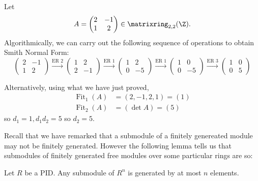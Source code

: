 \documentclass[a4paper]{article}
\theoremstyle{definition}
\DeclareMathOperator{\fit}{Fit}
\begin{document}
\begin{eg}
  Let
  \[
    A =
    \begin{pmatrix}
      2 & -1 \\
      1 & 2
    \end{pmatrix}
    \in \matrixring_{2, 2}(\Z).
  \]
  Algorithmically, we can carry out the following sequence of operations to obtain Smith Normal Form:
  \[
    \begin{pmatrix}
      2 & -1 \\
      1 & 2
    \end{pmatrix}
    \stackrel{\text{ER } 2}{\to}
    \begin{pmatrix}
      1 & 2 \\
      2 & -1
    \end{pmatrix}
    \stackrel{\text{ER } 1}{\to}
    \begin{pmatrix}
      1 & 2 \\
      0 & -5
    \end{pmatrix}
    \stackrel{\text{ER } 1}{\to}
    \begin{pmatrix}
      1 & 0 \\
      0 & -5
    \end{pmatrix}
    \stackrel{\text{ER } 3}{\to}
    \begin{pmatrix}
      1 & 0 \\
      0 & 5
    \end{pmatrix}
  \]

  Alternatively, using what we have just proved,
  \begin{align*}
    \fit_1(A) &= (2, -1, 2, 1) = (1) \\
    \fit_2(A) &= (\det A) = (5)
  \end{align*}
  so \(d_1 = 1, d_1d_2 = 5\) so \(d_2 = 5\).
\end{eg}

Recall that we have remarked that a submodule of a finitely genereated module may not be finitely generated. However the following lemma tells us that submodules of finitely generated free modules over some particular rings are so:

\begin{lemma}
  Let \(R\) be a PID. Any submodule of \(R^n\) is generated by at most \(n\) elements.
\end{lemma}
\end{document}
